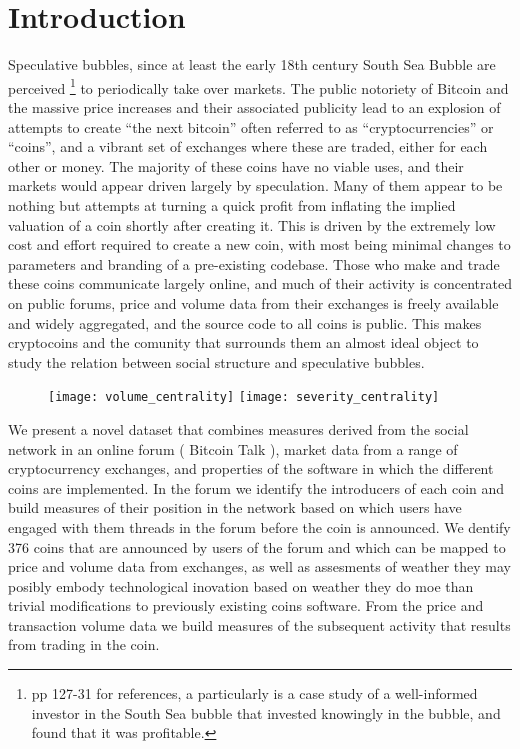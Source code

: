 \section{Introduction}

Speculative bubbles, since at least the early 18th century South Sea Bubble are perceived \footnote{\cite{garber2001famous} pp 127-31 for references, a particularly is \cite{temin2004riding} a case study of a well-informed investor in the South Sea bubble that invested knowingly in the bubble, and found that it was profitable. } to periodically take over markets. %
The public notoriety of Bitcoin and the massive price increases and their associated publicity  lead to an explosion of attempts to create ``the next bitcoin'' often referred to as ``cryptocurrencies'' or ``coins'', and a vibrant set of exchanges where these are traded, either for each other or money.
The majority of these coins have no viable uses, and their markets would appear driven largely by speculation.
Many of them appear to be nothing but attempts at turning a quick profit from inflating the implied valuation of a coin shortly after creating it.
This is driven by the extremely low cost and effort required to create a new coin, with most being minimal changes to parameters and branding of a pre-existing codebase.
Those who make and trade these coins communicate largely online, and much of their activity is concentrated on public forums, price and volume data from their exchanges is freely available and widely aggregated, and the source code to all coins is public.
This makes cryptocoins and the comunity that surrounds them an almost ideal object to study the relation between social structure and speculative bubbles.
\begin{figure}[h]
\texttt{[image: volume\_centrality]}
\texttt{[image: severity\_centrality]}
\end{figure}

We present a novel dataset that combines measures derived from the social network in an online forum ( Bitcoin Talk ), market data from a range of cryptocurrency exchanges, and properties of the software in which the different coins are implemented.
In the forum we identify the introducers of each coin and build measures of their position in the network based on which users have engaged with them threads in the forum before the coin is announced.
We dentify 376 coins that are announced by users of the forum and which can be mapped to price and volume data from exchanges, as well as assesments of weather they may posibly embody technological inovation based on weather they do moe than trivial modifications to previously existing coins software.
From the price and transaction volume data we build measures of the subsequent activity that results from trading in the coin. 


